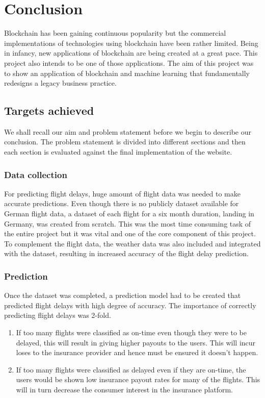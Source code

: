 \chapter{Conclusion}
Blockchain has been gaining continuous popularity but the commercial implementations of technologies using blockchain have been rather limited. Being in infancy, new applications of blockchain are being created at a great pace. This project also intends to be one of those applications. The aim of this project was to show an application of blockchain and machine learning that fundamentally redesigns a legacy business practice.

\section{Targets achieved}
We shall recall our aim and problem statement before we begin to describe our conclusion. The problem statement is divided into different sections and then each section is evaluated against the final implementation of the website. 

\subsection{Data collection}
For predicting flight delays, huge amount of flight data was needed to make accurate predictions. Even though there is no publicly dataset available for German flight data, a dataset of each flight for a six month duration, landing in Germany, was created from scratch. This was the most time consuming task of the entire project but it was vital and one of the core component of this project.
\\ To complement the flight data, the weather data was also included and integrated with the dataset, resulting in increased accuracy of the flight delay prediction.

\subsection{Prediction}
Once the dataset was completed, a prediction model had to be created that predicted flight delays with high degree of accuracy. The importance of correctly predicting flight delays was 2-fold.
\begin{enumerate}
    \item If too many flights were classified as on-time even though they were to be delayed, this will result in giving higher payouts to the users. This will incur loses to the insurance provider and hence must be ensured it doesn't happen.
    \item If too many flights were classified as delayed even if they are on-time, the users would be shown low insurance payout rates for many of the flights. This will in turn decrease the consumer interest in the insurance platform.
\end{enumerate}


